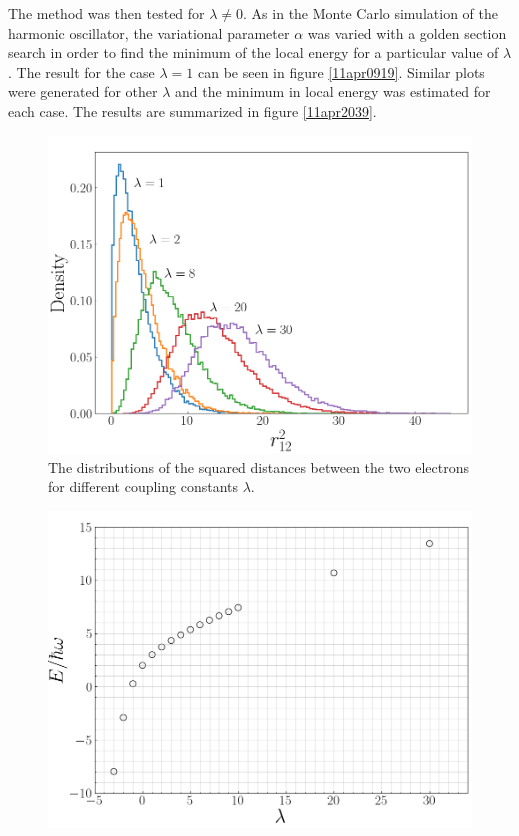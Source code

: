 \documentclass[twocolumn]{article}
\begin{document}
\begin{large}
The method was then tested for $\lambda\neq 0$. As in the Monte Carlo simulation of the harmonic oscillator, the variational parameter $\alpha$ was varied with a golden section search in order to find the minimum of the local energy for a particular value of $\lambda$. The result for the case $\lambda = 1$ can be seen in figure \ref{11apr0919}. Similar plots were generated for other $\lambda$ and the minimum in local energy was estimated for each case. The results are summarized in figure \ref{11apr2039}.
\begin{figure}[!b]
    \includegraphics[scale=0.35]{distances.png}
    \caption{The distributions of the squared distances between the two electrons for different coupling constants $\lambda$.}
    \label{11apr2001}
\end{figure}
\begin{figure}[!t]
    \includegraphics[scale=0.35]{LambdaRelationship.png}

\end{figure}
\end{large}
\end{document}
